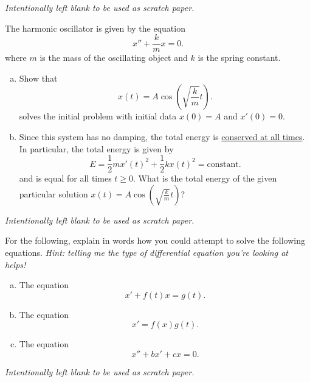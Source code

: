 \documentclass[12pt]{amsbook}
\begin{document}
\newpage
\emph{Intentionally left blank to be used as scratch paper.}\\


\newpage
\begin{problem}
The harmonic oscillator is given by the equation
\[
x''+ \frac{k}{m}x = 0.
\]
where $m$ is the mass of the oscillating object and $k$ is the spring constant.
\begin{enumerate}[(a)]
    \item Show that
    \[
    x(t)=A \cos\left(\sqrt{\frac{k}{m}}t\right).
    \]
    solves the initial problem with initial data $x(0)=A$ and $x'(0)=0$.
    \vspace*{6cm}
    \item Since this system has no damping, the total energy is \underline{conserved at all times}.  In particular, the total energy is given by
    \[
    E=\frac{1}{2}mx'(t)^2+\frac{1}{2}kx(t)^2 = \textrm{constant}.
    \]
    and is equal for all times $t\geq 0$. What is the total energy of the given particular solution $x(t)=A\cos\left(\sqrt{\frac{k}{m}}t\right)$?
    \vspace*{5cm}
    
\end{enumerate}
\end{problem}

\newpage
\emph{Intentionally left blank to be used as scratch paper.}\\


\newpage
\begin{problem} For the following, explain in words how you could attempt to solve the following equations.  \emph{Hint: telling me the type of differential equation you're looking at helps!}
\begin{enumerate}[(a)]
    \item The equation
    \[
    x'+f(t)x=g(t).
    \]
    \vspace*{5cm}
    \item The equation 
    \[
    x'=f(x)g(t).
    \]
    \vspace*{5cm}
    \item The equation
    \[
    x''+bx'+cx=0.
    \]
\end{enumerate}
\end{problem}

\newpage
\emph{Intentionally left blank to be used as scratch paper.}\\
\end{document}
